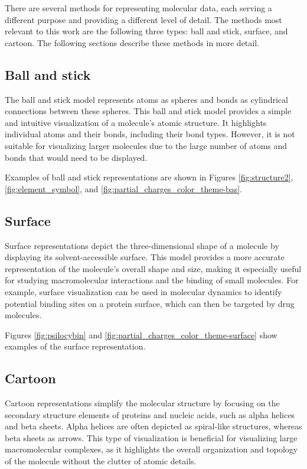 \documentclass[
  digital,     %
  oneside,     %
  nosansbold,  %
  nocolorbold, %
  lof,         %
  lot,         %
]{fithesis4}
\begin{document}

There are several methods for representing molecular data, each serving a different purpose and providing a different level of detail. The methods most relevant to this work are the following three types: ball and stick, surface, and cartoon. The following sections describe these methods in more detail.

\subsection{Ball and stick}
\label{subsection:ball_and_stick}

The ball and stick model represents atoms as spheres and bonds as cylindrical connections between these spheres. This ball and stick model provides a simple and intuitive visualization of a molecule's atomic structure. It highlights individual atoms and their bonds, including their bond types. \cite{tsai2003introduction} However, it is not suitable for visualizing larger molecules due to the large number of atoms and bonds that would need to be displayed.

Examples of ball and stick representations are shown in Figures \ref{fig:structure2}, \ref{fig:element_symbol}, and \ref{fig:partial_charges_color_theme-bas}.

\subsection{Surface}
\label{subsection:surface}

Surface representations depict the three-dimensional shape of a molecule by displaying its solvent-accessible surface. This model provides a more accurate representation of the molecule's overall shape and size, making it especially useful for studying macromolecular interactions and the binding of small molecules. For example, surface visualization can be used in molecular dynamics to identify potential binding sites on a protein surface, which can then be targeted by drug molecules. \cite{MIAO20191049}

Figures \ref{fig:psilocybin} and \ref{fig:partial_charges_color_theme-surface} show examples of the surface representation.

\subsection{Cartoon}
\label{subsection:cartoon}

Cartoon representations simplify the molecular structure by focusing on the secondary structure elements of proteins and nucleic acids, such as alpha helices and beta sheets. Alpha helices are often depicted as spiral-like structures, whereas beta sheets as arrows. This type of visualization is beneficial for visualizing large macromolecular complexes, as it highlights the overall organization and topology of the molecule without the clutter of atomic details. \cite{richardson1985schematic}
\end{document}
